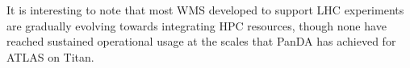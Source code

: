 It is interesting to note that most WMS developed to support LHC experiments
are gradually evolving towards integrating HPC resources, though none have
reached sustained operational usage at the scales that PanDA has achieved for
ATLAS on Titan.




